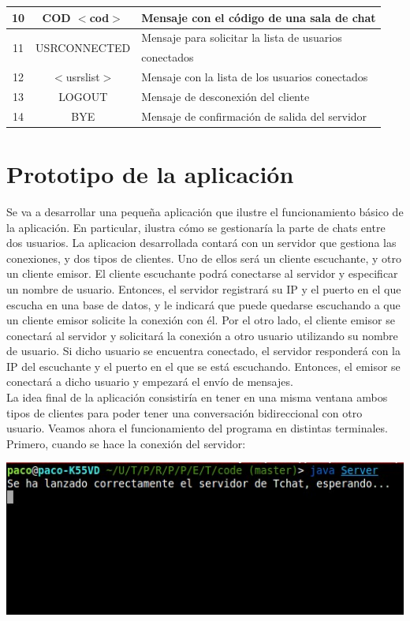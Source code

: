 \documentclass[12pt]{article}       %
\begin{document}
\begin{center}
\begin{tabular}{|c|c|l|}
10 & COD $<$cod$>$ & Mensaje con el código de una sala de chat\\
\hline
\multirow{2}{*}{11} & \multirow{2}{*}{USRCONNECTED} & Mensaje para solicitar la lista de usuarios\\
					& 								& conectados\\
\hline
12 & $<$usrslist$>$ & Mensaje con la lista de los usuarios conectados\\
\hline
13 & LOGOUT & Mensaje de desconexión del cliente\\
\hline
14 & BYE & Mensaje de confirmación de salida del servidor \\
\hline
\end{tabular}
\end{center}

\section{Prototipo de la aplicación}

Se va a desarrollar una pequeña aplicación que ilustre el funcionamiento básico de la aplicación. En particular, ilustra cómo se gestionaría la parte de chats entre dos usuarios. La aplicacion desarrollada contará con un servidor que gestiona las conexiones, y dos tipos de clientes. Uno de ellos será un cliente escuchante, y otro un cliente emisor. El cliente escuchante podrá conectarse al servidor y especificar un nombre de usuario. Entonces, el servidor registrará su IP y el puerto en el que escucha en una base de datos, y le indicará que puede quedarse escuchando a que un cliente emisor solicite la conexión con él. Por el otro lado, el cliente emisor se conectará al servidor y solicitará la conexión a otro usuario utilizando su nombre de usuario. Si dicho usuario se encuentra conectado, el servidor responderá con la IP del escuchante y el puerto en el que se está escuchando. Entonces, el emisor se conectará a dicho usuario y empezará el envío de mensajes.\\

La idea final de la aplicación consistiría en tener en una misma ventana ambos tipos de clientes para poder tener una conversación bidireccional con otro usuario. Veamos ahora el funcionamiento del programa en distintas terminales. Primero, cuando se hace la conexión del servidor:\\
\begin{center}
\includegraphics[scale=0.7]{images/Selection_001}
\end{center}
\end{document}
